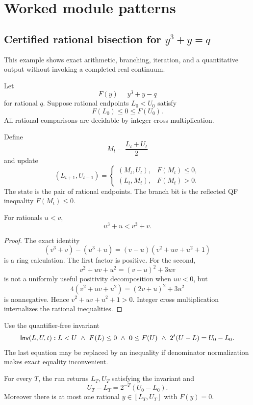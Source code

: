 
\section{Worked module patterns}
\label{sec:examples}

\subsection{Certified rational bisection for \texorpdfstring{\(y^3+y=q\)}{y3+y=q}}

This example shows exact arithmetic, branching, iteration, and a quantitative
output without invoking a completed real continuum.

Let
\[
     F(y)=y^3+y-q
\]
for rational \(q\).  Suppose rational endpoints \(L_0<U_0\) satisfy
\[
       F(L_0)\le0\le F(U_0).
\]
All rational comparisons are decidable by integer cross multiplication.

Define
\[
  M_t=\frac{L_t+U_t}{2}
\]
and update
\[
 (L_{t+1},U_{t+1})=
 \begin{cases}
  (M_t,U_t),&F(M_t)\le0,\\
  (L_t,M_t),&F(M_t)>0.
 \end{cases}
\]
The state is the pair of rational endpoints.  The branch bit is the reflected
QF inequality \(F(M_t)\le0\).

\begin{lemma}
For rationals \(u<v\),
\[
      u^3+u<v^3+v.
\]
\end{lemma}

\begin{proof}
The exact identity
\[
 (v^3+v)-(u^3+u)
   =(v-u)(v^2+uv+u^2+1)
\]
is a ring calculation.  The first factor is positive.  For the second,
\[
 v^2+uv+u^2
   = (v-u)^2+3uv
\]
is not a uniformly useful positivity decomposition when \(uv<0\), but
\[
 4(v^2+uv+u^2)
    =(2v+u)^2+3u^2
\]
is nonnegative.  Hence \(v^2+uv+u^2+1>0\).  Integer cross multiplication
internalizes the rational inequalities.
\end{proof}

Use the quantifier-free invariant
\[
\mathsf{Inv}(L,U,t):
  L<U\ \wedge\
  F(L)\le0\ \wedge\
  0\le F(U)\ \wedge\
  2^t(U-L)=U_0-L_0.
\]
The last equation may be replaced by an inequality if denominator
normalization makes exact equality inconvenient.

\begin{theorem}[Bisection contract]
For every \(T\), the run returns \(L_T,U_T\) satisfying the invariant and
\[
       U_T-L_T=2^{-T}(U_0-L_0).
\]
Moreover there is at most one rational \(y\in[L_T,U_T]\) with \(F(y)=0\).
\end{theorem}

